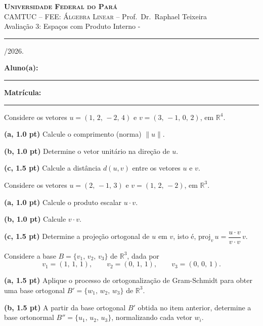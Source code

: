 \documentclass[12pt, addpoints]{exam}
\begin{document}
\begin{center}
    \textsc{\textbf{Universidade Federal do Pará} \\
    CAMTUC -- FEE: Álgebra Linear} -- Prof.\ Dr.\ Raphael Teixeira \\
    \vspace{0.1cm}
    Avaliação 3: Espaços com Produto Interno \hspace{0.6cm}-\hspace{0.6cm} \rule{2.5cm}{0.1pt}/2026.
\end{center}
\vspace{0.3cm}
\noindent
\textbf{Aluno(a):} \rule{8cm}{0.1pt} \quad \textbf{Matrícula:} \rule{3.5cm}{0.1pt}
\vspace{0.0cm}
\begin{questions}

\question
Considere os vetores $u=(1,\,2,\,-2,\,4)$ e $v=(3,\,-1,\,0,\,2)$, em $\mathbb{R}^4$.

\textbf{(a, 1.0 pt)} Calcule o comprimento (norma) $\|u\|$.

\textbf{(b, 1.0 pt)} Determine o vetor unitário na direção de $u$.

\textbf{(c, 1.5 pt)} Calcule a distância $d(u,v)$ entre os vetores $u$ e $v$.

\question
Considere os vetores $u=(2,\,-1,\,3)$ e $v=(1,\,2,\,-2)$, em $\mathbb{R}^3$.

\textbf{(a, 1.0 pt)} Calcule o produto escalar $u\cdot v$.

\textbf{(b, 1.0 pt)} Calcule $v\cdot v$.

\textbf{(c, 1.5 pt)} Determine a projeção ortogonal de $u$ em $v$, isto é, $\text{proj}_v\,u = \dfrac{u\cdot v}{v\cdot v}\,v$.

\question
Considere a base $B=\{v_1,\,v_2,\,v_3\}$ de $\mathbb{R}^3$, dada por
\[
  v_1=(1,\,1,\,1), \qquad v_2=(0,\,1,\,1), \qquad v_3=(0,\,0,\,1).
\]

\textbf{(a, 1.5 pt)} Aplique o processo de ortogonalização de Gram-Schmidt para obter uma base ortogonal $B'=\{w_1,\,w_2,\,w_3\}$ de $\mathbb{R}^3$.

\textbf{(b, 1.5 pt)} A partir da base ortogonal $B'$ obtida no item anterior, determine a base ortonormal $B''=\{u_1,\,u_2,\,u_3\}$, normalizando cada vetor $w_i$.

\end{questions}
\end{document}
